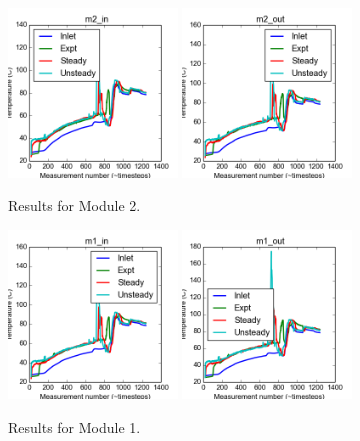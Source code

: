 \documentclass{article}
\begin{document}
\clearpage
\begin{figure}[!ht]
\centering
\includegraphics[width=0.4\textwidth]{../../data/ICSolar/images/Jan31_m2_in_compare.png}\hspace{0.05\textwidth}
\includegraphics[width=0.4\textwidth]{../../data/ICSolar/images/Jan31_m2_out_compare.png}\hspace{0.05\textwidth}\\
\caption{Results for Module 2.}\end{figure}
\begin{figure}[!ht]
\centering
\includegraphics[width=0.4\textwidth]{../../data/ICSolar/images/Jan31_m1_in_compare.png}\hspace{0.05\textwidth}
\includegraphics[width=0.4\textwidth]{../../data/ICSolar/images/Jan31_m1_out_compare.png}\hspace{0.05\textwidth}\\
\caption{Results for Module 1.}\end{figure}
\end{document}
